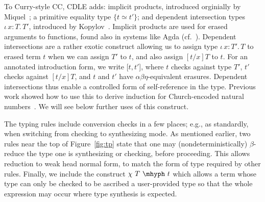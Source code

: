 \documentclass{article}
\newcommand{\abs}[4]{{#1}\, #2\! : \! #3.\, #4}
\begin{document}
To Curry-style CC, CDLE adds: implicit products, introduced orginially
by Miquel~\cite{miquel01}; a primitive equality type $\{ t \simeq
t'\}$; and dependent intersection types $\abs{\iota}{x}{T}{T'}$,
introduced by Kopylov~\cite{kopylov03}.  Implicit products are used
for erased arguments to functions, found also in systems like Agda
(cf.~\cite{mishraLinger08}).  Dependent intersections are a rather
exotic construct allowing us to assign type $\abs{\iota}{x}{T'}{T}$ to
erased term $t$ when we can assign $T'$ to $t$, and also assign
$[t/x]T$ to $t$.  For an annotated introduction form, we write
$[t,t'$], where $t$ checks against type $T'$, $t'$ checks against
$[t/x]T$, and $t$ and $t'$ have $\alpha\beta\eta$-equivalent
erasures.  Dependent intersections thus enable a controlled form of
self-reference in the type.  Previous work showed how to use this to
derive induction for Church-encoded natural numbers~\cite{stump18}.
We will see below further uses of this construct.

The typing rules include conversion checks in a few places; e.g., as
standardly, when switching from checking to synthesizing mode.  As mentioned
earlier, two rules near the top of Figure~\ref{fig:tp} state that one may
(nondeterministically) $\beta$-reduce the type one is synthesizing or checking,
before proceeding.
This allows reduction to weak head normal form, to match the form of type
required by other rules.
Finally, we include the construct $\chi\ T\ \mhyph\ t$ which allows a term whose
type can only be checked to be ascribed a user-provided type so that the whole
expression may occur where type synthesis is expected.
\end{document}
